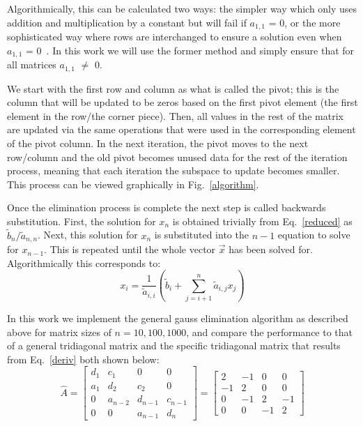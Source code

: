 \documentclass[prc,amsmath,twocolumn,superscriptaddress]{revtex4}
\begin{document}
Algorithmically, this can be calculated two ways: the simpler way which only uses addition and multiplication by a constant but will fail if $a_{1,1}$ = 0, or the more sophisticated way where rows are interchanged to ensure a solution even when $a_{1,1}$ = 0~\cite{book}. In this work we will use the former method and simply ensure that for all matrices $a_{1,1}$ $\neq$ 0.

We start with the first row and column as what is called the pivot; this is the column that will be updated to be zeros based on the first pivot element (the first element in the row/the corner piece). Then, all values in the rest of the matrix are updated via the same operations that were used in the corresponding element of the pivot column. In the next iteration, the pivot moves to the next row/column and the old pivot becomes unused data for the rest of the iteration process, meaning that each iteration the subspace to update becomes smaller. This process can be viewed graphically in Fig.~\ref{algorithm}.

Once the elimination process is complete the next step is called backwards substitution. First, the solution for $x_n$ is obtained trivially from Eq.~\ref{reduced} as $\tilde{b}_n/\tilde{a}_{n,n}$. Next, this solution for $x_n$ is substituted into the $n-1$ equation to solve for $x_{n-1}$. This is repeated until the whole vector $\vec{x}$ has been solved for. Algorithmically this corresponds to:
\begin{equation}
x_i=\frac{1}{\tilde{a}_{i,i}}\left(\tilde{b}_i + \sum_{j=i+1}^n \tilde{a}_{i,j}x_j \right)
\end{equation}

In this work we implement the general gauss elimination algorithm as described above for matrix sizes of $n=10,100,1000$, and compare the performance to that of a general tridiagonal matrix and the specific tridiagonal matrix that results from Eq.~\ref{deriv} both shown below:
\begin{equation}
\hat{A}=\begin{bmatrix} d_{1} & c_{1} &0&0\\ a_{1}  & d_{2} &c_{2}&0 \\ 0  & a_{n-2}  &d_{n-1}&c_{n-1} \\ 0  &0& a_{n-1}  &d_{n} \end{bmatrix}=
\begin{bmatrix} 2 & -1&0&0\\ -1  & 2 &0&0 \\ 0  & -1  &2&-1 \\ 0  &0& -1  &2 \end{bmatrix}
\end{equation}
\end{document}
